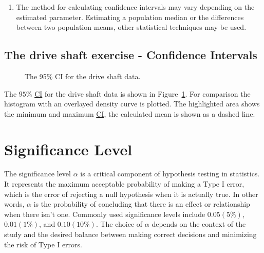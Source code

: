 \documentclass[
  a4paper,
]{scrbook}
\providecommand{\tightlist}{%
  \setlength{\itemsep}{0pt}\setlength{\parskip}{0pt}}\usepackage{longtable,booktabs,array}
\begin{document}
\begin{enumerate}
\def\labelenumi{\arabic{enumi}.}
\setcounter{enumi}{3}
\tightlist
\item
  The method for calculating confidence intervals may vary depending on
  the estimated parameter. Estimating a population median or the
  differences between two population means, other statistical techniques
  may be used.
\end{enumerate}

\subsection{The drive shaft exercise - Confidence
Intervals}\label{the-drive-shaft-exercise---confidence-intervals}

\begin{figure}[ht]


\caption{\label{fig-ci}The 95\% CI for the drive shaft data.}

\end{figure}%

The \(95\%\) \hyperref[acronyms_CI]{CI} for the drive shaft data is
shown in Figure~\ref{fig-ci}. For comparison the histogram with an
overlayed density curve is plotted. The highlighted area shows the
minimum and maximum \hyperref[acronyms_CI]{CI}, the calculated mean is
shown as a dashed line.

\section{Significance Level}\label{significance-level}

The significance level \(\alpha\) is a critical component of hypothesis
testing in statistics. It represents the maximum acceptable probability
of making a Type I error, which is the error of rejecting a null
hypothesis when it is actually true. In other words, \(\alpha\) is the
probability of concluding that there is an effect or relationship when
there isn't one. Commonly used significance levels include
\(0.05 (5\%)\), \(0.01 (1\%)\), and \(0.10 (10\%)\). The choice of
\(\alpha\) depends on the context of the study and the desired balance
between making correct decisions and minimizing the risk of Type I
errors.
\end{document}

